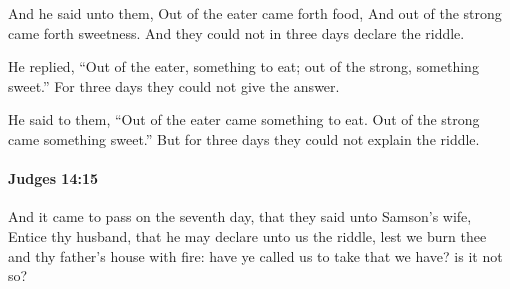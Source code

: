 			\begin{versebox}
					\item[BHS] 
					\item[ASV] And he said unto them, Out of the eater came forth food, And out of the strong came forth sweetness. And they could not in three days declare the riddle.
					\item[NIV] He replied, “Out of the eater, something to eat; out of the strong, something sweet.” For three days they could not give the answer.
					\item[NRSV] He said to them, “Out of the eater came something to eat. Out of the strong came something sweet.” But for three days they could not explain the riddle.
			\end{versebox}

		\paragraph{Judges 14:15} %
			\label{JUDGES-14-15}

			And it came to pass on the seventh day, that they said unto Samson’s wife, Entice thy husband, that he may declare unto us the riddle, lest we burn thee and thy father’s house with fire: have ye called us to take that we have? is it not so?


